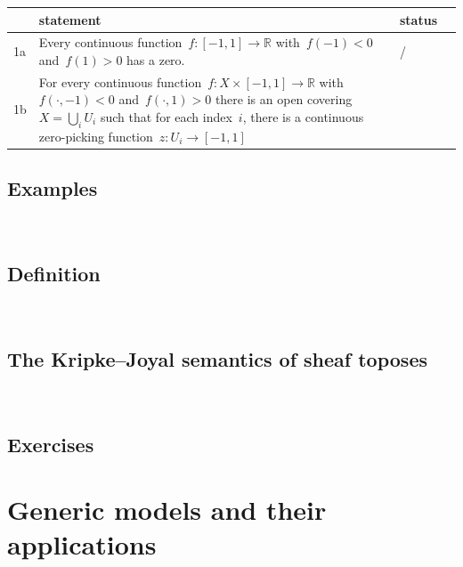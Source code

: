 \documentclass[10pt,reqno,a4paper,openany]{amsbook}
\newcommand{\cmark}{\ding{51}}
\newcommand{\xmark}{\ding{55}}
\theoremstyle{definition}
\theoremstyle{plain}
\theoremstyle{remark}
\newcommand{\RR}{\mathbb{R}}
\newcommand{\?}{\,{:}\,}
\renewcommand{\_}{\mathpunct{.}\,}
\begin{document}
\newpage

\begin{tabular}{@{}lp{}ll@{}}
  \toprule
  & statement & status \\\midrule
  1a & Every continuous function~$f : [-1,1] \to \RR$ with~$f(-1) < 0$
  and~$f(1) > 0$ has a zero. & \cmark/\xmark \\
  1b & For every continuous function~$f : X \times [-1,1] \to \RR$
  with~$f(\cdot,-1) < 0$ and~$f(\cdot,1) > 0$ there is an open covering~$X =
  \bigcup_i U_i$ such that for each index~$i$, there is a continuous
  zero-picking function~$z : U_i \to [-1,1]$
\end{tabular}

\section{Examples}
\newpage
\ \newpage

\section{Definition}
\newpage
\ \newpage

\section{The Kripke--Joyal semantics of sheaf toposes}
\newpage
\ \newpage

\section{Exercises}


\chapter{Generic models and their applications}
\label{lect:generic}
\end{document}
